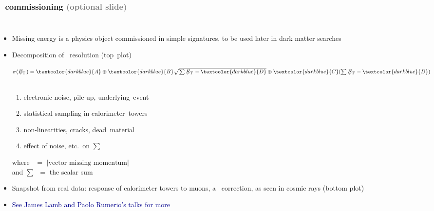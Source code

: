 \documentclass[compress]{beamer}
\begin{document}
\begin{frame}
\frametitle{\met\ commissioning \textcolor{gray}{(optional slide)}}

\vfill
\begin{columns}

\begin{itemize}\setlength{\itemsep}{0.15 cm}
\item Missing energy is a physics object commissioned in simple signatures, to be used later in dark matter searches

\item Decomposition of \met\ resolution \mbox{(top plot)\hspace{-1 cm}}

\mbox{\scriptsize $\sigma(\mbox{\met}) = \textcolor{darkblue}{A} \oplus \textcolor{darkblue}{B} \sqrt{\sum\mbox{\met} - \textcolor{darkblue}{D}} \oplus \textcolor{darkblue}{C} (\sum\mbox{\met} - \textcolor{darkblue}{D})$ \hspace{-1 cm}}

\renewcommand\theenumi{\Alph{enumi}}
\begin{enumerate} \scriptsize
\item \scriptsize electronic noise, pile-up, \mbox{underlying event\hspace{-1 cm}}
\item \scriptsize statistical sampling in \mbox{calorimeter towers\hspace{-1 cm}}
\item \scriptsize non-linearities, cracks, \mbox{dead material\hspace{-1 cm}}
\item \scriptsize effect of noise, etc.\ on $\sum$\met
\end{enumerate}

{\scriptsize where \met\ $=$ $\left|\mbox{vector missing momentum}\right|$ \\ and $\sum$\met\ $=$ the scalar sum}

\item Snapshot from real data: response of calorimeter towers to muons, a \met\ correction, as seen in cosmic rays (bottom plot)

\item \textcolor{darkblue}{See James Lamb and Paolo Rumerio's talks for more}
\end{itemize}

\vspace{0.25 cm}


\end{columns}
\end{frame}
\end{document}
